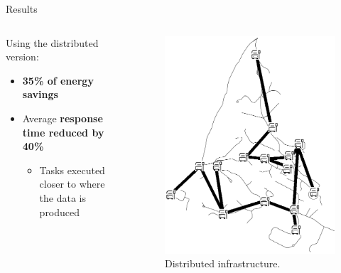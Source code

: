 \documentclass[Ligatures=TeX,table,svgnames,usetotalslideindicator,compress,10pt,aspectratio=169]{beamer}
\begin{document}
\begin{frame}{Results}
  \begin{columns}

  \begin{column}{0.5\textwidth}

Using the distributed version:
\begin{itemize}
    \item \textbf{35\% of energy savings} 
    \item Average \textbf{response time reduced by 40\%}
    \begin{itemize}
    \item Tasks executed closer to where the data is produced
    \end{itemize}
\end{itemize}

  \end{column}
  \begin{column}{0.5\textwidth}

  
   \begin{figure}[!h]
        \centering
        \includegraphics[width=.8\textwidth]{images/vieille-toulouse.png}
        \caption{Distributed  infrastructure.}
      \end{figure}

  
    \end{column}
\end{columns}

\end{frame}
\end{document}

